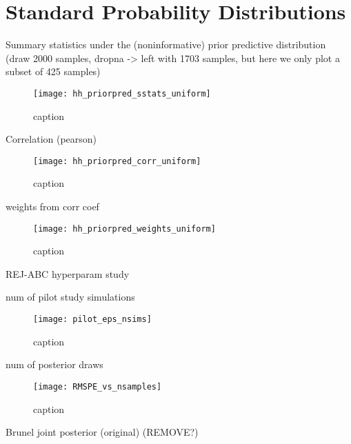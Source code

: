 \chapter{Standard Probability Distributions}\label{sec:Appendix A}


Summary statistics under the (noninformative) prior predictive distribution (draw 2000 samples, dropna -> left with 1703 samples, but here we only plot a subset of 425 samples)

\begin{figure}[H]
    \centering
    \texttt{[image: hh\_priorpred\_sstats\_uniform]}
    \caption{caption}
    \label{fig:fig1}
\end{figure} 


Correlation (pearson) 

\begin{figure}[H]
    \centering
    \texttt{[image: hh\_priorpred\_corr\_uniform]}
    \caption{caption}
    \label{fig:fig1}
\end{figure} 

weights from corr coef

\begin{figure}[H]
    \centering
    \texttt{[image: hh\_priorpred\_weights\_uniform]}
    \caption{caption}
    \label{fig:fig1}
\end{figure} 

 
REJ-ABC hyperparam study 

num of pilot study simulations 

\begin{figure}[H]
    \centering
    \texttt{[image: pilot\_eps\_nsims]}
    \caption{caption}
    \label{fig:fig1}
\end{figure} 

num of posterior draws

\begin{figure}[H]
    \centering
    \texttt{[image: RMSPE\_vs\_nsamples]}
    \caption{caption}
    \label{fig:fig1}
\end{figure} 


Brunel joint posterior (original) (REMOVE?)

